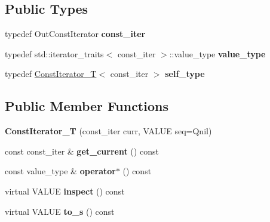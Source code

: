 \subsection*{Public Types}
\begin{DoxyCompactItemize}
\item 
typedef Out\+Const\+Iterator {\bfseries const\+\_\+iter}\hypertarget{classswig_1_1ConstIterator__T_adc4a143fe1e99a1e7b6b233238d06122}{}\label{classswig_1_1ConstIterator__T_adc4a143fe1e99a1e7b6b233238d06122}

\item 
typedef std\+::iterator\+\_\+traits$<$ const\+\_\+iter $>$\+::value\+\_\+type {\bfseries value\+\_\+type}\hypertarget{classswig_1_1ConstIterator__T_afc03b5dd14a60708c631ca1e0c96b562}{}\label{classswig_1_1ConstIterator__T_afc03b5dd14a60708c631ca1e0c96b562}

\item 
typedef \hyperlink{classswig_1_1ConstIterator__T}{Const\+Iterator\+\_\+T}$<$ const\+\_\+iter $>$ {\bfseries self\+\_\+type}\hypertarget{classswig_1_1ConstIterator__T_afe3f9f82b1bb5e1104565a197f00ab1a}{}\label{classswig_1_1ConstIterator__T_afe3f9f82b1bb5e1104565a197f00ab1a}

\end{DoxyCompactItemize}
\subsection*{Public Member Functions}
\begin{DoxyCompactItemize}
\item 
{\bfseries Const\+Iterator\+\_\+T} (const\+\_\+iter curr, V\+A\+L\+UE seq=Qnil)\hypertarget{classswig_1_1ConstIterator__T_a3b0391160d6f8d1d960ebeab51770d4a}{}\label{classswig_1_1ConstIterator__T_a3b0391160d6f8d1d960ebeab51770d4a}

\item 
const const\+\_\+iter \& {\bfseries get\+\_\+current} () const \hypertarget{classswig_1_1ConstIterator__T_a7257f158f7c372883c1d4165bc9c305e}{}\label{classswig_1_1ConstIterator__T_a7257f158f7c372883c1d4165bc9c305e}

\item 
const value\+\_\+type \& {\bfseries operator$\ast$} () const \hypertarget{classswig_1_1ConstIterator__T_a1926d05674b26f4a2b8f6161cb9fab8e}{}\label{classswig_1_1ConstIterator__T_a1926d05674b26f4a2b8f6161cb9fab8e}

\item 
virtual V\+A\+L\+UE {\bfseries inspect} () const \hypertarget{classswig_1_1ConstIterator__T_ab630b1fc9cda85005480cfa45225043c}{}\label{classswig_1_1ConstIterator__T_ab630b1fc9cda85005480cfa45225043c}

\item 
virtual V\+A\+L\+UE {\bfseries to\+\_\+s} () const \hypertarget{classswig_1_1ConstIterator__T_af51655177b21da549723af22503e1b7b}{}\label{classswig_1_1ConstIterator__T_af51655177b21da549723af22503e1b7b}

\end{DoxyCompactItemize}
